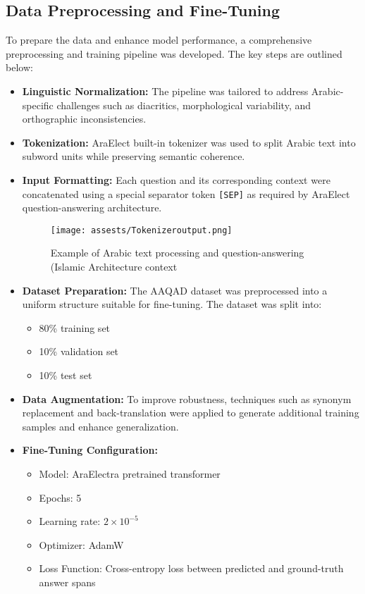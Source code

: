 \documentclass[conference]{IEEEtran}
\begin{document}
\subsection{Data Preprocessing and Fine-Tuning}
To prepare the data and enhance model performance, a comprehensive preprocessing and training pipeline was developed. The key steps are outlined below:
\begin{itemize}
    \item \textbf{Linguistic Normalization:} The pipeline was tailored to address Arabic-specific challenges such as diacritics, morphological variability, and orthographic inconsistencies.
    \item \textbf{Tokenization:} AraElect built-in tokenizer was used to split Arabic text into subword units while preserving semantic coherence.

    \item \textbf{Input Formatting:} Each question and its corresponding context were concatenated using a special separator token \texttt{[SEP]} as required by AraElect question-answering architecture.
    
\begin{figure}[H]
  \centering
  \texttt{[image: assests/Tokenizeroutput.png]}
  \caption{Example of Arabic text processing and question-answering (Islamic Architecture context}
  \label{fig:Example of Arabic text processing and question-answering (Islamic Architecture context}
  \end{figure}

    \item \textbf{Dataset Preparation:} The AAQAD dataset was preprocessed into a uniform structure suitable for fine-tuning. The dataset was split into:
    \begin{itemize}
        \item 80\% training set
        \item 10\% validation set
        \item 10\% test set
    \end{itemize}

    \item \textbf{Data Augmentation:} To improve robustness, techniques such as synonym replacement and back-translation were applied to generate additional training samples and enhance generalization.

    \item \textbf{Fine-Tuning Configuration:}
    \begin{itemize}
        \item Model: AraElectra pretrained transformer
        \item Epochs: 5
        \item Learning rate: $2 \times 10^{-5}$
        \item Optimizer: AdamW
        \item Loss Function: Cross-entropy loss between predicted and ground-truth answer spans
    \end{itemize}
\end{itemize}
\end{document}
